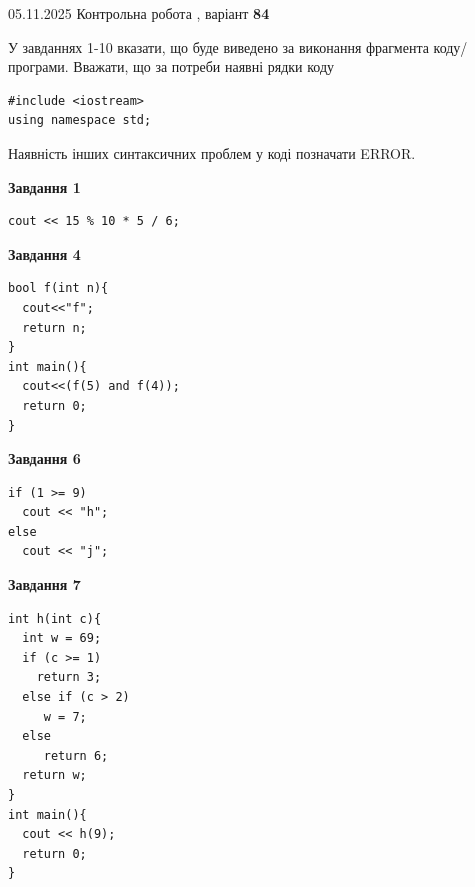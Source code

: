 \documentclass[12pt, ukrainian]{article}
\begin{document}
\newpage

{\Large{05.11.2025 Контрольна робота , варіант  \No \textbf { 84 }\par}}
{
\begin {large}
У завданнях 1-10 вказати, що буде виведено за виконання фрагмента коду/про\-гра\-ми.
Вважати, що за потреби наявні рядки коду
\begin{verbatim}
#include <iostream>
using namespace std;
\end{verbatim}
Наявність інших синтаксичних проблем у коді позначати ERROR.

\begin{minipage}[t]{7.0cm}

\begin{center}
\textbf{Завдання 1}
\end{center}
\vspace{-8mm}

\begin{verbatim}
cout << 15 % 10 * 5 / 6;
\end{verbatim}



\begin{center}
\textbf{Завдання 4}
\end{center}
\vspace{-8mm}

\begin{verbatim}
bool f(int n){
  cout<<"f";
  return n;
}
int main(){
  cout<<(f(5) and f(4));
  return 0;
}
\end{verbatim}



\begin{center}
\textbf{Завдання 6}
\end{center}
\vspace{-8mm}

\begin{verbatim}
if (1 >= 9)
  cout << "h";
else
  cout << "j";
\end{verbatim}



\begin{center}
\textbf{Завдання 7}
\end{center}
\vspace{-8mm}

\begin{verbatim}
int h(int c){
  int w = 69;
  if (c >= 1)
    return 3;
  else if (c > 2)
     w = 7;
  else
     return 6;
  return w;
}
int main(){
  cout << h(9);
  return 0;
}
\end{verbatim}


\end{minipage}
\end{large}}
\end{document}

